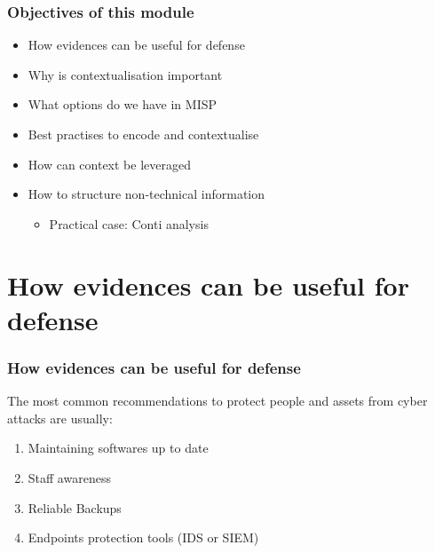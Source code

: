 
\begin{frame}[t,plain]
\titlepage
\end{frame}

\begin{frame}
    \frametitle{Objectives of this module}
    \begin{itemize}
        \item How evidences can be useful for defense
        \item Why is contextualisation important
        \item What options do we have in MISP
        \item Best practises to encode and contextualise
        \item How can context be leveraged
        \item How to structure non-technical information
        \begin{itemize}
            \item Practical case: Conti analysis
        \end{itemize}
    \end{itemize}
\end{frame}

\section{How evidences can be useful for defense}
\begin{frame}
    \frametitle{How evidences can be useful for defense}
    The most common recommendations to protect people and assets from cyber attacks are usually:
    \begin{enumerate}
        \item Maintaining softwares up to date
        \item Staff awareness
        \item Reliable Backups
        \item Endpoints protection tools (IDS or SIEM)
    \end{enumerate}


\end{frame}

